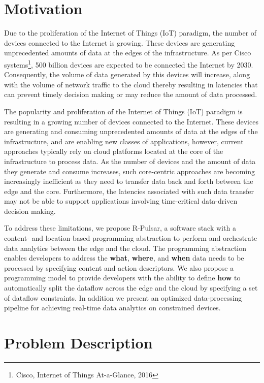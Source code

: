 \section{Motivation}

Due to the proliferation of the Internet of Things (IoT) paradigm, the number of devices connected to the Internet is growing. These devices are generating unprecedented amounts of data at the edges of the infrastructure. As per Cisco systems\footnote{Cisco, Internet of Things At-a-Glance, 2016 }, 500 billion devices are expected to be connected the Internet by 2030. Consequently, the volume of data generated by this devices will increase, along with the volume of network traffic to the cloud thereby resulting in latencies that can prevent timely decision making or may reduce the amount of data processed.


The popularity and proliferation of the Internet of Things (IoT) paradigm is resulting in a growing number of devices connected to the Internet. These devices are generating and consuming unprecedented amounts of data at the edges of the infrastructure, and are enabling new classes of applications, however, current approaches typically rely on cloud
platforms located at the core of the infrastructure to process data. As the number of devices and the amount of data they generate and consume increases, such core-centric approaches are becoming increasingly inefficient as they need to transfer data back and forth between the edge and the core. Furthermore, the latencies associated with such data transfer may not be able to support applications involving time-critical data-driven decision making.


To address these limitations, we propose R-Pulsar, a software stack with a content- and location-based programming abstraction to perform and orchestrate data analytics between the edge and the cloud. The programming abstraction enables developers to address the \textbf{what}, \textbf{where}, and \textbf{when} data needs to be processed by specifying content and action descriptors. We also propose a programming model to provide developers with the ability to define \textbf{how} to automatically split the dataflow across the edge and the cloud by specifying a set of dataflow constraints. In addition we present an optimized data-processing pipeline for achieving real-time data analytics on constrained devices.

\section{Problem Description}


